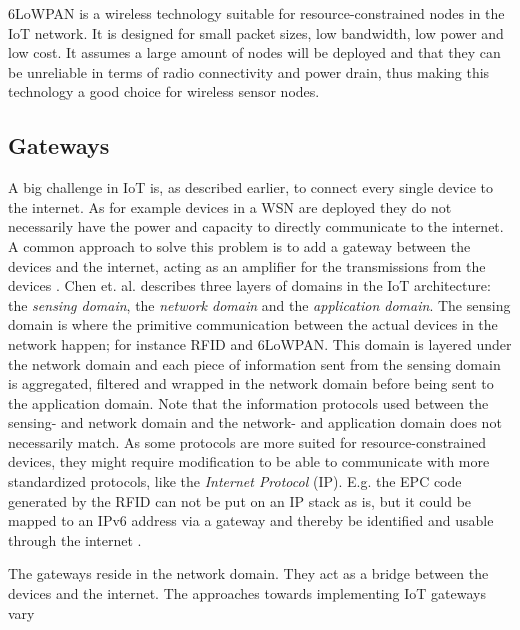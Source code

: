 6LoWPAN is a wireless technology suitable for resource-constrained nodes in the
IoT network. It is designed for small packet sizes, low bandwidth, low power
and low cost. It assumes a large amount of nodes will be deployed and that they
can be unreliable in terms of radio connectivity and power drain, thus making
this technology a good choice for wireless sensor nodes. \cite{kushalnagar2007ipv6}


\subsection{Gateways}

A big challenge in IoT is, as described earlier, to connect every single device
to the internet. As for example devices in a WSN are deployed they do not
necessarily have the power and capacity to directly communicate to the
internet. A common approach to solve this problem is to add a gateway between
the devices and the internet, acting as an amplifier for the transmissions from
the devices \cite{zhu2010iot}. Chen et. al. \cite{chen2011brief} describes three
layers of domains in the IoT architecture: the \textit{sensing domain}, the
\textit{network domain} and the \textit{application domain}. The sensing domain
is where the primitive communication between the actual devices in the network
happen; for instance RFID and 6LoWPAN. This domain is layered under the network
domain and each piece of information sent from the sensing domain is
aggregated, filtered and wrapped in the network domain before being sent to the
application domain. Note that the information protocols used between the
sensing- and network domain and the network- and application domain does not
necessarily match. As some protocols are more suited for resource-constrained
devices, they might require modification to be able to communicate with more
standardized protocols, like the \textit{Internet Protocol} (IP). E.g. the EPC
code generated by the RFID can not be put on an IP stack as is, but it could be
mapped to an IPv6 address via a gateway and thereby be identified and usable
through the internet \cite{lee2007epc}.

The gateways reside in the network domain. They act as a bridge between the
devices and the internet. The approaches towards implementing IoT gateways vary


